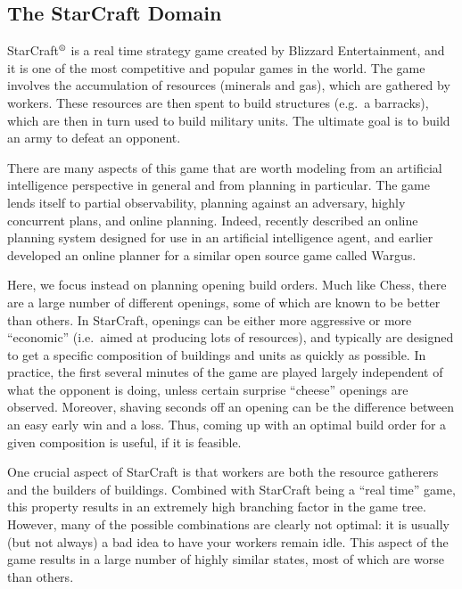 \documentclass[letterpaper]{article}
\theoremstyle{plain} \newtheorem{theorem}{Theorem} \newtheorem{proposition}{Proposition} \newtheorem{lemma}{Lemma}
\theoremstyle{definition} \newtheorem{definition}{Definition} \newtheorem{conjecture}{Conjecture} \newtheorem*{example}{Example}
\theoremstyle{remark} \newtheorem*{remark}{Remark} \newtheorem*{note}{Note} \newtheorem{case}{Case}
\begin{document}
\subsection{The StarCraft Domain}

StarCraft$^\textrm{\textregistered}$ is a real time strategy game
created by Blizzard Entertainment, and it is one of the most competitive
and popular games in the world. The game involves the accumulation
of resources (minerals and gas), which are gathered by workers.
These resources are then spent to build structures (e.g.\ a barracks),
which are then in turn used to build military units. The ultimate goal is
to build an army to defeat an opponent.


There are many aspects of this game that are worth modeling from
an artificial intelligence perspective in general and from planning
in particular. The game lends itself to partial observability,
planning against an adversary, highly concurrent plans, and online
planning.  Indeed, \citet{churchill11build} recently described an
online planning system designed for use in an artificial intelligence
agent, and \citet{chan07online} earlier developed an online planner
for a similar open source game called Wargus.

Here, we focus instead on planning opening build orders. Much like
Chess, there are a large number of different openings, some of which
are known to be better than others. In StarCraft, openings can be
either more aggressive or more ``economic'' (i.e.\ aimed at producing
lots of resources), and typically are designed to get a specific composition
of buildings and units as quickly as possible.  In practice, the
first several minutes of the game are played largely independent
of what the opponent is doing, unless certain surprise ``cheese''
openings are observed. Moreover, shaving seconds off an opening can
be the difference between an easy early win and a loss. Thus, coming
up with an optimal build order for a given composition is useful,
if it is feasible.

One crucial aspect of StarCraft is that workers are both the resource gatherers
and the builders of buildings. Combined with StarCraft being a ``real time'' game, 
this property results in an extremely high branching factor in the game tree. However,
many of the possible combinations are clearly not optimal: it is usually (but not always) a bad idea
to have your workers remain idle. This aspect of the game results in a large number of highly similar
states, most of which are worse than others.
\end{document}
